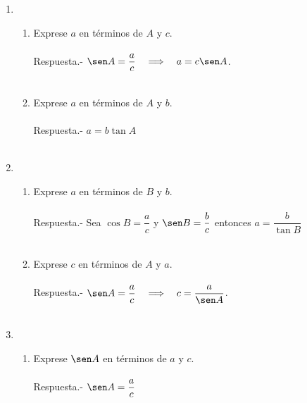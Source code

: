 \begin{enumerate}
\begin{enumerate}[\bfseries a)]
\end{enumerate}

\item 
\begin{enumerate}[\bfseries a)]

    \item Exprese $a$ en términos de $A$ y $c$.\\\\
	Respuesta.-\; $\sen A = \dfrac{a}{c} \quad \Longrightarrow \quad a = c\sen A$.\\\\

    \item Exprese $a$ en términos de $A$ y $b$.\\\\
	Respuesta.-\; $a = b\tan A$\\\\

\end{enumerate}

\item 
\begin{enumerate}[\bfseries a)]

    \item Exprese $a$ en términos de $B$ y $b$.\\\\
	Respuesta.-\; Sea $\cos B = \dfrac{a}{c}$ y $\sen B = \dfrac{b}{c}$ entonces $a = \dfrac{b}{\tan B}$\\\\

    \item Exprese $c$ en términos de $A$ y $a$.\\\\
	Respuesta.-\; $\sen A = \dfrac{a}{c} \quad \Longrightarrow \quad c = \dfrac{a}{\sen A}$.\\\\

\end{enumerate}

\item 
\begin{enumerate}[\bfseries a)]

    \item Exprese $\sen A$ en términos de $a$ y $c$.\\\\
	Respuesta.-\; $\sen A = \dfrac{a}{c}$\\\\


\end{enumerate}
\end{enumerate}
